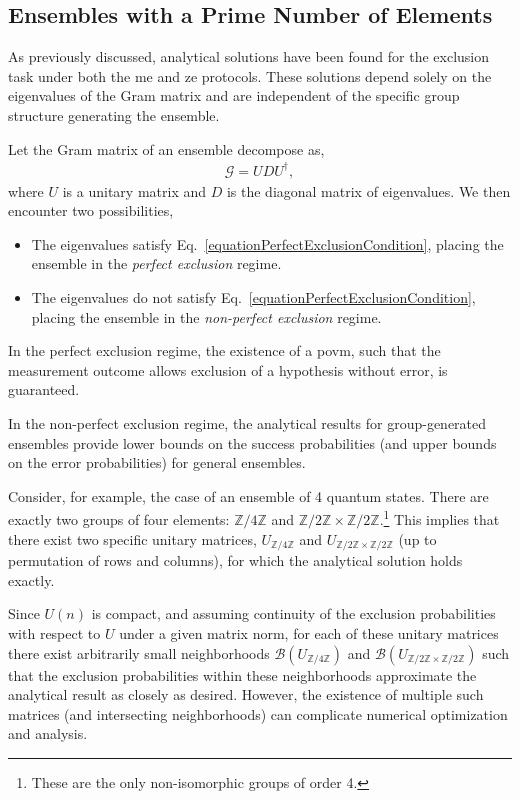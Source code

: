 \documentclass[12pt,letterpaper]{article}
\begin{document}
\begin{multicols}{2}
\subsection{Ensembles with a Prime Number of Elements}\label{sectionEnsemblesWithPrime}

As previously discussed, analytical solutions have been found for the exclusion task under both the \gls{me} and \gls{ze} protocols. These solutions depend solely on the eigenvalues of the Gram matrix and are independent of the specific group structure generating the ensemble.

Let the Gram matrix of an ensemble decompose as,
\begin{align*}
	\mathcal{G} = U D U^\dagger,
\end{align*}
where $U$ is a unitary matrix and $D$ is the diagonal matrix of eigenvalues. We then encounter two possibilities,
\begin{itemize}
	\item The eigenvalues satisfy Eq.~\eqref{equationPerfectExclusionCondition}, placing the ensemble in the \emph{perfect exclusion} regime.
	\item The eigenvalues do not satisfy Eq.~\eqref{equationPerfectExclusionCondition}, placing the ensemble in the \emph{non-perfect exclusion} regime.
\end{itemize}

In the perfect exclusion regime, the existence of a \gls{povm}, such that the measurement outcome allows exclusion of a hypothesis without error, is guaranteed.

In the non-perfect exclusion regime, the analytical results for group-generated ensembles provide lower bounds on the success probabilities (and upper bounds on the error probabilities) for general ensembles.

Consider, for example, the case of an ensemble of 4 quantum states. There are exactly two groups of four elements: $\mathbb{Z}/4\mathbb{Z}$ and $\mathbb{Z}/2\mathbb{Z} \times \mathbb{Z}/2\mathbb{Z}$.\footnote{These are the only non-isomorphic groups of order 4.} This implies that there exist two specific unitary matrices, $U_{\mathbb{Z}/4\mathbb{Z}}$ and $U_{\mathbb{Z}/2\mathbb{Z} \times \mathbb{Z}/2\mathbb{Z}}$ (up to permutation of rows and columns), for which the analytical solution holds exactly.

Since $U(n)$ is compact, and assuming continuity of the exclusion probabilities with respect to $U$ under a given matrix norm, for each of these unitary matrices there exist arbitrarily small neighborhoods $\mathcal{B}(U_{\mathbb{Z}/4\mathbb{Z}})$ and $\mathcal{B}(U_{\mathbb{Z}/2\mathbb{Z} \times \mathbb{Z}/2\mathbb{Z}})$ such that the exclusion probabilities within these neighborhoods approximate the analytical result as closely as desired. However, the existence of multiple such matrices (and intersecting neighborhoods) can complicate numerical optimization and analysis.


\end{multicols}
\end{document}
